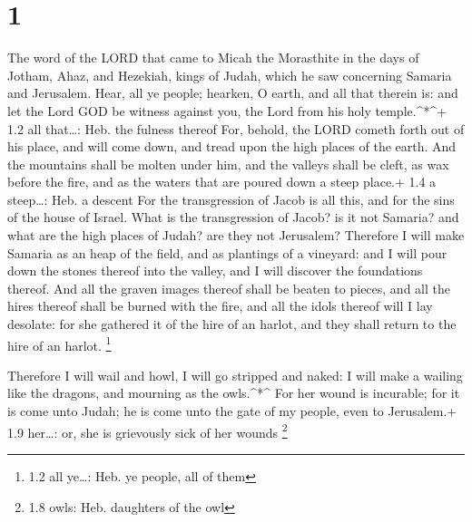 \hypertarget{section}{%
\section{1}\label{section}}

 The word of the LORD that came to Micah the Morasthite in
the days of Jotham, Ahaz, and Hezekiah, kings of Judah, which he saw
concerning Samaria and Jerusalem.  Hear, all ye people;
hearken, O earth, and all that therein is: and let the Lord GOD be
witness against you, the Lord from his holy temple.\^{}*\^{}+ 1.2 all
that\ldots: Heb. the fulness thereof  For, behold, the LORD
cometh forth out of his place, and will come down, and tread upon the
high places of the earth.  And the mountains shall be molten
under him, and the valleys shall be cleft, as wax before the fire, and
as the waters that are poured down a steep place.+ 1.4 a steep\ldots:
Heb. a descent  For the transgression of Jacob is all this,
and for the sins of the house of Israel. What is the transgression of
Jacob? is it not Samaria? and what are the high places of Judah? are
they not Jerusalem?  Therefore I will make Samaria as an
heap of the field, and as plantings of a vineyard: and I will pour down
the stones thereof into the valley, and I will discover the foundations
thereof.  And all the graven images thereof shall be beaten
to pieces, and all the hires thereof shall be burned with the fire, and
all the idols thereof will I lay desolate: for she gathered it of the
hire of an harlot, and they shall return to the hire of an harlot.
\footnote{1.2 all ye\ldots: Heb. ye people, all of them}

 Therefore I will wail and howl, I will go stripped and
naked: I will make a wailing like the dragons, and mourning as the
owls.\^{}*\^{}  For her wound is incurable; for it is come
unto Judah; he is come unto the gate of my people, even to Jerusalem.+
1.9 her\ldots: or, she is grievously sick of her wounds \footnote{1.8
  owls: Heb. daughters of the owl}

